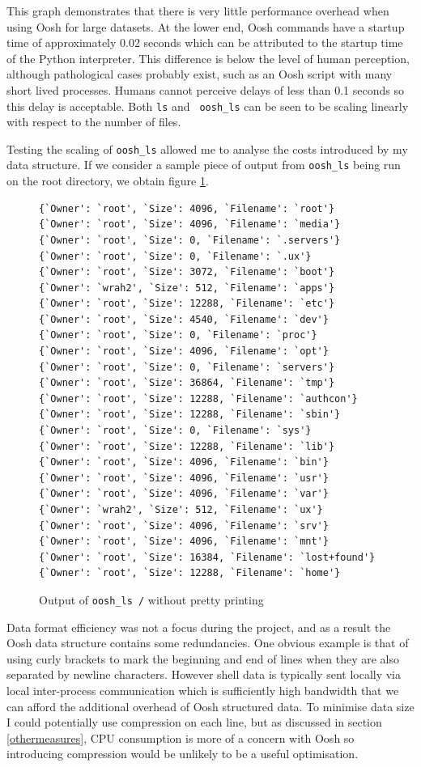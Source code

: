 \documentclass[12pt,twoside,notitlepage]{report}
\begin{document}
This graph demonstrates that there is very little performance overhead
when using Oosh for large datasets. At the lower end, Oosh commands
have a startup time of approximately 0.02 seconds which can be
attributed to the startup time of the Python interpreter. This
difference is below the level of human perception, although
pathological cases probably exist, such as an Oosh script with many
short lived processes. Humans cannot perceive delays of less than 0.1
seconds \cite{hci} so this delay is acceptable. Both {\tt ls} and {\tt
  oosh\_ls} can be seen to be scaling linearly with respect to the
number of files.

Testing the scaling of {\tt oosh\_ls} allowed me to analyse the costs
introduced by my data structure. If we consider a sample piece of output
from {\tt oosh\_ls} being run on the root directory, we obtain figure
\ref{lsroot}.

\begin{figure}[h]
\begin{Verbatim}[frame=single,framerule=0.2pt,framesep=5pt] 
{`Owner': `root', `Size': 4096, `Filename': `root'}
{`Owner': `root', `Size': 4096, `Filename': `media'}
{`Owner': `root', `Size': 0, `Filename': `.servers'}
{`Owner': `root', `Size': 0, `Filename': `.ux'}
{`Owner': `root', `Size': 3072, `Filename': `boot'}
{`Owner': `wrah2', `Size': 512, `Filename': `apps'}
{`Owner': `root', `Size': 12288, `Filename': `etc'}
{`Owner': `root', `Size': 4540, `Filename': `dev'}
{`Owner': `root', `Size': 0, `Filename': `proc'}
{`Owner': `root', `Size': 4096, `Filename': `opt'}
{`Owner': `root', `Size': 0, `Filename': `servers'}
{`Owner': `root', `Size': 36864, `Filename': `tmp'}
{`Owner': `root', `Size': 12288, `Filename': `authcon'}
{`Owner': `root', `Size': 12288, `Filename': `sbin'}
{`Owner': `root', `Size': 0, `Filename': `sys'}
{`Owner': `root', `Size': 12288, `Filename': `lib'}
{`Owner': `root', `Size': 4096, `Filename': `bin'}
{`Owner': `root', `Size': 4096, `Filename': `usr'}
{`Owner': `root', `Size': 4096, `Filename': `var'}
{`Owner': `wrah2', `Size': 512, `Filename': `ux'}
{`Owner': `root', `Size': 4096, `Filename': `srv'}
{`Owner': `root', `Size': 4096, `Filename': `mnt'}
{`Owner': `root', `Size': 16384, `Filename': `lost+found'}
{`Owner': `root', `Size': 12288, `Filename': `home'}
\end{Verbatim}
\caption{Output of {\tt oosh\_ls /} without pretty printing}
\label{lsroot}
\end{figure}

Data format efficiency was not a focus during the project, and as a
result the Oosh data structure contains some redundancies. One obvious
example is that of using curly brackets to mark the beginning and end
of lines when they are also separated by newline characters.  However
shell data is typically sent locally via local inter-process
communication which is sufficiently high bandwidth that we can afford
the additional overhead of Oosh structured data. To minimise data size
I could potentially use compression on each line, but as discussed in
section \ref{othermeasures}, CPU consumption is more of a concern with
Oosh so introducing compression would be unlikely to be a useful
optimisation.
\end{document}
